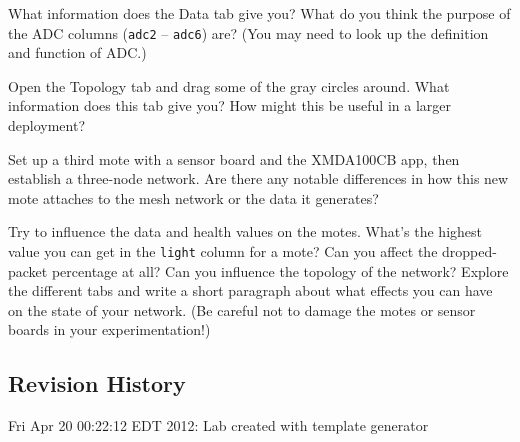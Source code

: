 \documentclass{article}
\begin{document}
 What information does the Data tab give you? What do you think the purpose of the ADC columns (\verb!adc2! -- \verb!adc6!) are? (You may need to look up the definition and function of ADC.)

 Open the Topology tab and drag some of the gray circles around. What information does this tab give you? How might this be useful in a larger deployment?

 Set up a third mote with a sensor board and the XMDA100CB app, then establish a three-node network. Are there any notable differences in how this new mote attaches to the mesh network or the data it generates?

 Try to influence the data and health values on the motes. What's the highest value you can get in the \verb!light! column for a mote? Can you affect the dropped-packet percentage at all? Can you influence the topology of the network? Explore the different tabs and write a short paragraph about what effects you can have on the state of your network. (Be careful not to damage the motes or sensor boards in your experimentation!)



\subsection*{Revision History}
\begin{itemize*}
 \item Fri Apr 20 00:22:12 EDT 2012: Lab created with template generator
\end{itemize*}
\end{document}
